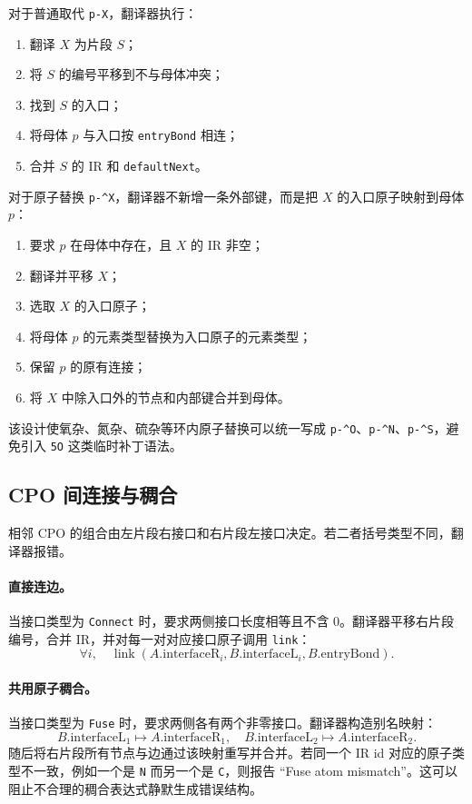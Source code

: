 \documentclass[UTF8,a4paper,11pt]{ctexart}
\begin{document}
对于普通取代 \verb|p-X|，翻译器执行：
\begin{enumerate}[leftmargin=2em]
  \item 翻译 $X$ 为片段 $S$；
  \item 将 $S$ 的编号平移到不与母体冲突；
  \item 找到 $S$ 的入口；
  \item 将母体 $p$ 与入口按 \verb|entryBond| 相连；
  \item 合并 $S$ 的 IR 和 \verb|defaultNext|。
\end{enumerate}

对于原子替换 \verb|p-^X|，翻译器不新增一条外部键，而是把 $X$ 的入口原子映射到母体 $p$：
\begin{enumerate}[leftmargin=2em]
  \item 要求 $p$ 在母体中存在，且 $X$ 的 IR 非空；
  \item 翻译并平移 $X$；
  \item 选取 $X$ 的入口原子；
  \item 将母体 $p$ 的元素类型替换为入口原子的元素类型；
  \item 保留 $p$ 的原有连接；
  \item 将 $X$ 中除入口外的节点和内部键合并到母体。
\end{enumerate}

该设计使氧杂、氮杂、硫杂等环内原子替换可以统一写成 \verb|p-^O|、\verb|p-^N|、\verb|p-^S|，避免引入 \verb|5O| 这类临时补丁语法。

\subsection{CPO 间连接与稠合}

相邻 CPO 的组合由左片段右接口和右片段左接口决定。若二者括号类型不同，翻译器报错。

\paragraph{直接连边。}
当接口类型为 \verb|Connect| 时，要求两侧接口长度相等且不含 0。翻译器平移右片段编号，合并 IR，并对每一对对应接口原子调用 \verb|link|：
\[
  \forall i,\quad
  \operatorname{link}(A.\mathrm{interfaceR}_i, B.\mathrm{interfaceL}_i, B.\mathrm{entryBond}).
\]

\paragraph{共用原子稠合。}
当接口类型为 \verb|Fuse| 时，要求两侧各有两个非零接口。翻译器构造别名映射：
\[
  B.\mathrm{interfaceL}_1 \mapsto A.\mathrm{interfaceR}_1,\quad
  B.\mathrm{interfaceL}_2 \mapsto A.\mathrm{interfaceR}_2.
\]
随后将右片段所有节点与边通过该映射重写并合并。若同一个 IR id 对应的原子类型不一致，例如一个是 \verb|N| 而另一个是 \verb|C|，则报告 ``Fuse atom mismatch''。这可以阻止不合理的稠合表达式静默生成错误结构。
\end{document}
